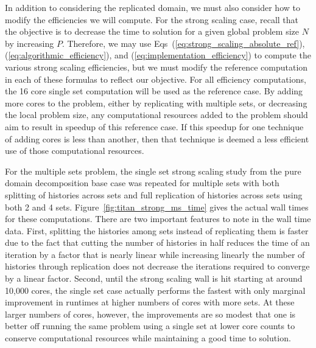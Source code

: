 In addition to considering the replicated domain, we must also
consider how to modify the efficiencies we will compute. For the
strong scaling case, recall that the objective is to decrease the time
to solution for a given global problem size $N$ by increasing
$P$. Therefore, we may use Eqs~(\ref{eq:strong_scaling_absolute_ref}),
(\ref{eq:algorithmic_efficiency}), and
(\ref{eq:implementation_efficiency}) to compute the various strong
scaling efficiencies, but we must modify the reference computation in
each of these formulas to reflect our objective. For all efficiency
computations, the 16 core single set computation will be used as the
reference case. By adding more cores to the problem, either by
replicating with multiple sets, or decreasing the local problem size,
any computational resources added to the problem should aim to result
in speedup of this reference case. If this speedup for one technique
of adding cores is less than another, then that technique is deemed a
less efficient use of those computational resources.

For the multiple sets problem, the single set strong scaling study
from the pure domain decomposition base case was repeated for multiple
sets with both splitting of histories across sets and full replication
of histories across sets using both 2 and 4
sets. Figure~\ref{fig:titan_strong_ms_time} gives the actual wall
times for these computations. There are two important features to note
in the wall time data. First, splitting the histories among sets
instead of replicating them is faster due to the fact that cutting the
number of histories in half reduces the time of an iteration by a
factor that is nearly linear while increasing linearly the number of
histories through replication does not decrease the iterations
required to converge by a linear factor. Second, until the strong
scaling wall is hit starting at around 10,000 cores, the single set
case actually performs the fastest with only marginal improvement in
runtimes at higher numbers of cores with more sets. At these larger
numbers of cores, however, the improvements are so modest that one is
better off running the same problem using a single set at lower core
counts to conserve computational resources while maintaining a good
time to solution.

